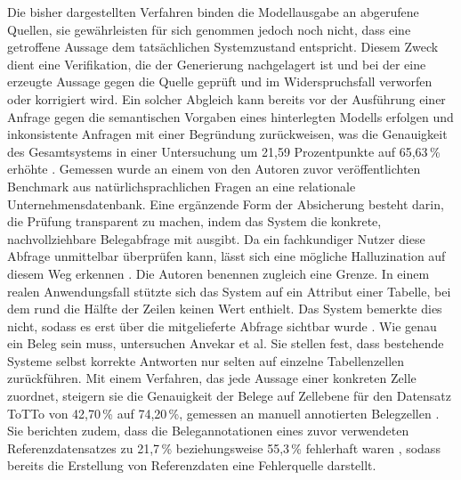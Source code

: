 Die bisher dargestellten Verfahren binden die Modellausgabe an abgerufene Quellen, sie gewährleisten für sich genommen jedoch noch nicht, dass eine getroffene Aussage dem tatsächlichen Systemzustand entspricht. Diesem Zweck dient eine Verifikation, die der Generierung nachgelagert ist und bei der eine erzeugte Aussage gegen die Quelle geprüft und im Widerspruchsfall verworfen oder korrigiert wird. Ein solcher Abgleich kann bereits vor der Ausführung einer Anfrage gegen die semantischen Vorgaben eines hinterlegten Modells erfolgen und inkonsistente Anfragen mit einer Begründung zurückweisen, was die Genauigkeit des Gesamtsystems in einer Untersuchung um 21,59 Prozentpunkte auf 65,63\,\% erhöhte \cite{allemang_increasing_2025}. Gemessen wurde an einem von den Autoren zuvor veröffentlichten Benchmark aus natürlichsprachlichen Fragen an eine relationale Unternehmensdatenbank. %
Eine ergänzende Form der Absicherung besteht darin, die Prüfung transparent zu machen, indem das System die konkrete, nachvollziehbare Belegabfrage mit ausgibt. Da ein fachkundiger Nutzer diese Abfrage unmittelbar überprüfen kann, lässt sich eine mögliche Halluzination auf diesem Weg erkennen \cite{theologitis_thucy_2026}.
Die Autoren benennen zugleich eine Grenze. In einem realen Anwendungsfall stützte sich das System auf ein Attribut einer Tabelle, bei dem rund die Hälfte der Zeilen keinen Wert enthielt. Das System bemerkte dies nicht, sodass es erst über die mitgelieferte Abfrage sichtbar wurde \cite{theologitis_thucy_2026}. Wie genau ein Beleg sein muss, untersuchen Anvekar et al. Sie stellen fest, dass bestehende Systeme selbst korrekte Antworten nur selten auf einzelne Tabellenzellen zurückführen. Mit einem Verfahren, das jede Aussage einer konkreten Zelle zuordnet, steigern sie die Genauigkeit der Belege auf Zellebene für den Datensatz ToTTo von 42,70\,\% auf 74,20\,\%, gemessen an manuell annotierten Belegzellen \cite{anvekar_traceback_2026}. %
Sie berichten zudem, dass die Belegannotationen eines zuvor verwendeten Referenzdatensatzes zu 21,7\,\% beziehungsweise 55,3\,\% fehlerhaft waren \cite{anvekar_traceback_2026}, sodass bereits die Erstellung von Referenzdaten eine Fehlerquelle darstellt.
